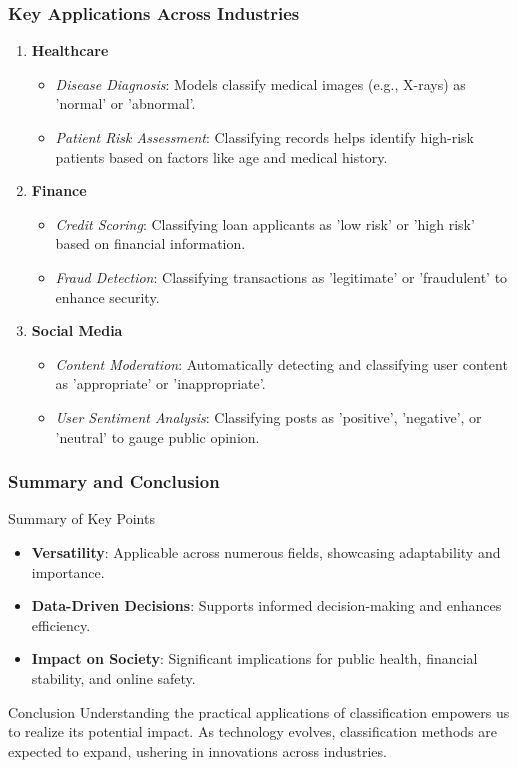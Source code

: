 \documentclass[aspectratio=169]{beamer}
\begin{document}
\begin{frame}[fragile]
    \frametitle{Key Applications Across Industries}
    \begin{enumerate}
        \item \textbf{Healthcare}
        \begin{itemize}
            \item \textit{Disease Diagnosis}: Models classify medical images (e.g., X-rays) as 'normal' or 'abnormal'.
            \item \textit{Patient Risk Assessment}: Classifying records helps identify high-risk patients based on factors like age and medical history.
        \end{itemize}

        \item \textbf{Finance}
        \begin{itemize}
            \item \textit{Credit Scoring}: Classifying loan applicants as 'low risk' or 'high risk' based on financial information.
            \item \textit{Fraud Detection}: Classifying transactions as 'legitimate' or 'fraudulent' to enhance security.
        \end{itemize}

        \item \textbf{Social Media}
        \begin{itemize}
            \item \textit{Content Moderation}: Automatically detecting and classifying user content as 'appropriate' or 'inappropriate'.
            \item \textit{User Sentiment Analysis}: Classifying posts as 'positive', 'negative', or 'neutral' to gauge public opinion.
        \end{itemize}
    \end{enumerate}
\end{frame}

\begin{frame}[fragile]
    \frametitle{Summary and Conclusion}
    \begin{block}{Summary of Key Points}
        \begin{itemize}
            \item \textbf{Versatility}: Applicable across numerous fields, showcasing adaptability and importance.
            \item \textbf{Data-Driven Decisions}: Supports informed decision-making and enhances efficiency.
            \item \textbf{Impact on Society}: Significant implications for public health, financial stability, and online safety.
        \end{itemize}
    \end{block}

    \begin{block}{Conclusion}
        Understanding the practical applications of classification empowers us to realize its potential impact. As technology evolves, classification methods are expected to expand, ushering in innovations across industries.
    \end{block}
\end{frame}
\end{document}
